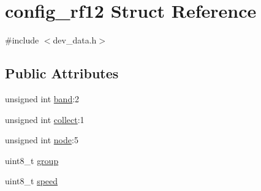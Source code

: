\hypertarget{structconfig__rf12}{\section{config\-\_\-rf12 Struct Reference}
\label{structconfig__rf12}
}


{\ttfamily \#include $<$dev\-\_\-data.\-h$>$}

\subsection*{Public Attributes}
\begin{DoxyCompactItemize}
\item 
unsigned int \hyperlink{structconfig__rf12_abb4aae82e8879f73368fa8d94145b715}{band}\-:2
\item 
unsigned int \hyperlink{structconfig__rf12_a217f695af8276c1da733e13bbdeab5a5}{collect}\-:1
\item 
unsigned int \hyperlink{structconfig__rf12_a9389bb8256b99c8743c6ab0d0b9d84f0}{node}\-:5
\item 
uint8\-\_\-t \hyperlink{structconfig__rf12_a6993b16dd675ec59f3747ed5f9510de8}{group}
\item 
uint8\-\_\-t \hyperlink{structconfig__rf12_a43fcf6110e6a133c6982081885f27de9}{speed}
\end{DoxyCompactItemize}



